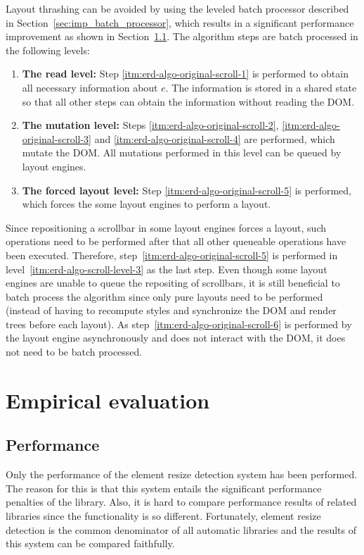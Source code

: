 \documentclass{acm_proc_article-sp}
\newcommand{\gls}[1]{#1}
\begin{document}
    Layout thrashing can be avoided by using the leveled batch processor described in Section~\ref{sec:imp_batch_processor}, which results in a significant performance improvement as shown in Section~\ref{sec:eval-perf}.
    The algorithm steps are batch processed in the following levels:
    \begin{enumerate}
      \item\label{itm:erd-algo-scroll-level-1}
        \textbf{The read level:}
        Step \ref{itm:erd-algo-original-scroll-1} is performed to obtain all necessary information about $e$.
        The information is stored in a shared state so that all other steps can obtain the information without reading the \gls{DOM}.
      \item\label{itm:erd-algo-scroll-level-2}
        \textbf{The mutation level:}
        Steps \ref{itm:erd-algo-original-scroll-2}, \ref{itm:erd-algo-original-scroll-3} and \ref{itm:erd-algo-original-scroll-4} are performed, which mutate the \gls{DOM}.
        All mutations performed in this level can be queued by layout engines.
      \item\label{itm:erd-algo-scroll-level-3}
        \textbf{The forced layout level:}
        Step \ref{itm:erd-algo-original-scroll-5} is performed, which forces the some layout engines to perform a layout.
    \end{enumerate}

    Since repositioning a scrollbar in some layout engines forces a layout, such operations need to be performed after that all other queueable operations have been executed.
    Therefore, step~\ref{itm:erd-algo-original-scroll-5} is performed in level~\ref{itm:erd-algo-scroll-level-3} as the last step.
    Even though some layout engines are unable to queue the repositing of scrollbars, it is still beneficial to batch process the algorithm since only pure layouts need to be performed (instead of having to recompute styles and synchronize the \gls{DOM} and render trees before each layout).
    As step~\ref{itm:erd-algo-original-scroll-6} is performed by the \gls{layout engine} asynchronously and does not interact with the \gls{DOM}, it does not need to be batch processed.

\section{Empirical evaluation}\label{sec:eval}
  \subsection{Performance}\label{sec:eval-perf}
    Only the performance of the element resize detection system has been performed.
    The reason for this is that this system entails the significant performance penalties of the library.
    Also, it is hard to compare performance results of related libraries since the functionality is so different.
    Fortunately, element resize detection is the common denominator of all automatic libraries and the results of this system can be compared faithfully.
\end{document}
